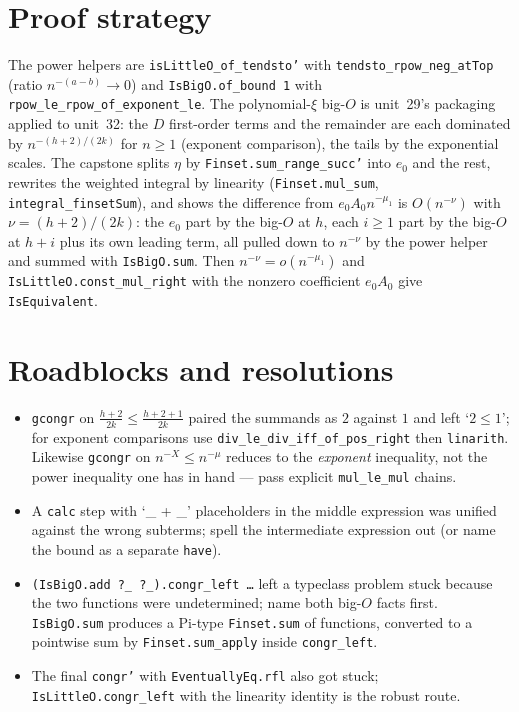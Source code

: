 \documentclass[11pt]{article}
\begin{document}
\section{Proof strategy}
The power helpers are \texttt{isLittleO\_of\_tendsto'} with \texttt{tendsto\_rpow\_neg\_atTop} (ratio
$n^{-(a-b)}\to0$) and \texttt{IsBigO.of\_bound 1} with \texttt{rpow\_le\_rpow\_of\_exponent\_le}. The
polynomial-$\xi$ big-$O$ is unit~29's packaging applied to unit~32: the $D$ first-order terms and the
remainder are each dominated by $n^{-(h+2)/(2k)}$ for $n\ge1$ (exponent comparison), the tails by the
exponential scales. The capstone splits $\eta$ by \texttt{Finset.sum\_range\_succ'} into $e_0$ and the
rest, rewrites the weighted integral by linearity (\texttt{Finset.mul\_sum}, \texttt{integral\_finsetSum}),
and shows the difference from $e_0A_0n^{-\mu_1}$ is $O(n^{-\nu})$ with $\nu=(h{+}2)/(2k)$: the $e_0$ part
by the big-$O$ at $h$, each $i\ge1$ part by the big-$O$ at $h+i$ plus its own leading term, all pulled down
to $n^{-\nu}$ by the power helper and summed with \texttt{IsBigO.sum}. Then $n^{-\nu}=o(n^{-\mu_1})$
and \texttt{IsLittleO.const\_mul\_right} with the nonzero coefficient $e_0A_0$ give \texttt{IsEquivalent}.

\section{Roadblocks and resolutions}
\begin{itemize}
\item \texttt{gcongr} on $\tfrac{h+2}{2k}\le\tfrac{h+2+1}{2k}$ paired the summands as $2$ against $1$
and left `$2\le1$'; for exponent comparisons use \texttt{div\_le\_div\_iff\_of\_pos\_right} then
\texttt{linarith}. Likewise \texttt{gcongr} on $n^{-X}\le n^{-\mu}$ reduces to the \emph{exponent}
inequality, not the power inequality one has in hand --- pass explicit \texttt{mul\_le\_mul} chains.
\item A \texttt{calc} step with `\_ + \_' placeholders in the middle expression was unified against the
wrong subterms; spell the intermediate expression out (or name the bound as a separate \texttt{have}).
\item \texttt{(IsBigO.add ?\_ ?\_).congr\_left \dots} left a typeclass problem stuck because the two
functions were undetermined; name both big-$O$ facts first. \texttt{IsBigO.sum} produces a Pi-type
\texttt{Finset.sum} of functions, converted to a pointwise sum by \texttt{Finset.sum\_apply} inside
\texttt{congr\_left}.
\item The final \texttt{congr'} with \texttt{EventuallyEq.rfl} also got stuck; \texttt{IsLittleO.congr\_left}
with the linearity identity is the robust route.
\end{itemize}
\end{document}
